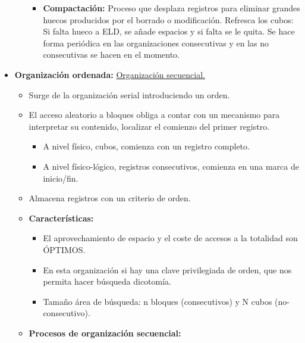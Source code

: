 \documentclass[12pt, twoside, openright]{report} %
\begin{document}
\begin{itemize}
\begin{itemize}
\begin{itemize}
      \item \textbf{Compactación:} Proceso que desplaza registros para
        eliminar grandes huecos producidos por el borrado o
        modificación. Refresca los cubos: Si falta hueco a ELD, se añade
        espacios y si falta se le quita. Se hace forma periódica en las
        organizaciones consecutivas y en las no consecutivas se hacen en
        el momento.
        
      \end{itemize}
    \end{itemize}
  \item \textbf{Organización ordenada:} \underline{Organización secuencial.}
    

    \begin{itemize}
    \item Surge de la organización serial introduciendo un orden.
      
    \item El acceso aleatorio a bloques obliga a contar con un mecanismo
      para interpretar su contenido, localizar el comienzo del primer
      registro.
      

      \begin{itemize}
      \item A nivel físico, cubos, comienza con un registro completo.
        
      \item A nivel físico-lógico, registros consecutivos, comienza en una
        marca de inicio/fin.
        
      \end{itemize}
    \item Almacena registros con un criterio de orden.
      
    \item \textbf{Características:}
      

      \begin{itemize}
      \item El aprovechamiento de espacio y el coste de accesos a la
        totalidad son ÓPTIMOS.
        
      \item En esta organización si hay una clave privilegiada de orden, que
        nos permita hacer búsqueda dicotomía.
        
      \item Tamaño área de búsqueda: n bloques (consecutivos) y N cubos
        (no-consecutivo).
        
      \end{itemize}
    \item \textbf{Procesos de organización secuencial:}
      


\end{itemize}
\end{itemize}
\end{document}

